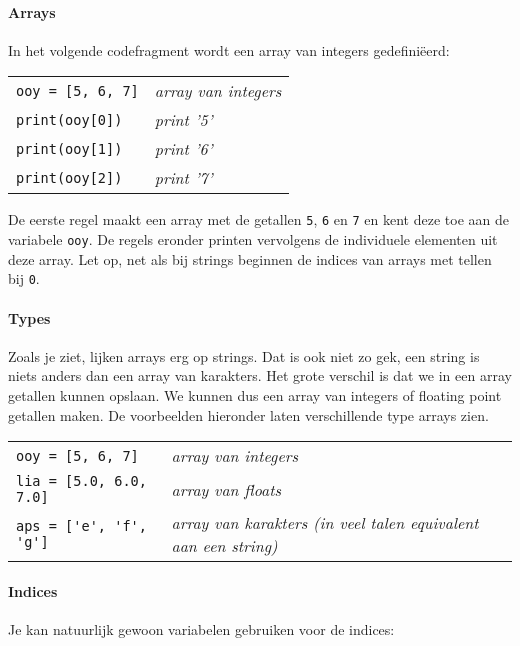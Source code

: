 \paragraph{Arrays}
In het volgende codefragment wordt een array van integers gedefini\"{e}erd:

\begin{tabular}{l@{\hskip 1em$\rightarrow$\hskip 1em}l}
\verb|ooy = [5, 6, 7]|    &   \emph{array van integers} \\
\verb|print(ooy[0])|       &   \emph{print '5'} \\
\verb|print(ooy[1])|       &   \emph{print '6'} \\
\verb|print(ooy[2])|       &   \emph{print '7'}
\end{tabular}

De eerste regel maakt een array met de getallen \texttt{5}, \texttt{6} en \texttt{7} en kent deze toe aan de variabele \texttt{ooy}. De regels eronder printen vervolgens de individuele elementen uit deze array. Let op, net als bij strings beginnen de indices van arrays met tellen bij \texttt{0}.

\paragraph{Types}
Zoals je ziet, lijken arrays erg op strings. Dat is ook niet zo gek, een string is niets anders dan een array van karakters. Het grote verschil is dat we in een array getallen kunnen opslaan. We kunnen dus een array van integers of floating point getallen maken. De voorbeelden hieronder laten verschillende type arrays zien.

\begin{tabular}{l@{\hskip 1em$\rightarrow$\hskip 1em}l}
\verb|ooy = [5, 6, 7]|       & \emph{array van integers} \\
\verb|lia = [5.0, 6.0, 7.0]| & \emph{array van floats} \\
\verb|aps = ['e', 'f', 'g']| & \emph{array van karakters (in veel talen equivalent aan een string)}\\
\end{tabular}

\paragraph{Indices}
Je kan natuurlijk gewoon variabelen gebruiken voor de indices:


